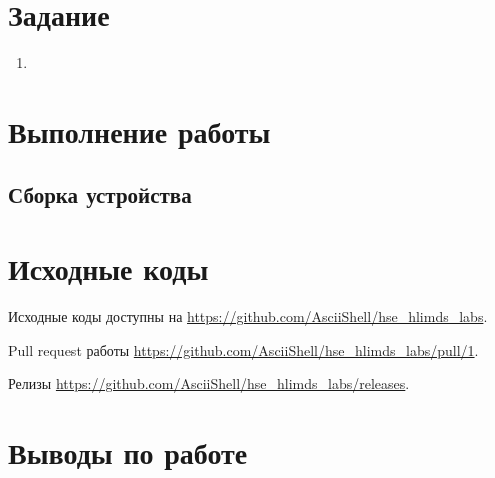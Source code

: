 \documentclass[a4paper,14pt]{article}
\begin{document}
    
    \tableofcontents
    \pagebreak


    \section{Задание}

    \begin{enumerate}
        \item
    \end{enumerate}


    \section{Выполнение работы}

    \subsection{Сборка устройства}


    \section{Исходные коды}

    Исходные коды доступны на \href{https://github.com/AsciiShell/hse_hlimds_labs}
    {https://github.com/AsciiShell/hse\_hlimds\_labs}.

    Pull request работы \href{https://github.com/AsciiShell/hse_hlimds_labs/pull/2}
    {https://github.com/AsciiShell/hse\_hlimds\_labs/pull/1}.

    Релизы \href{https://github.com/AsciiShell/hse_hlimds_labs/releases}
    {https://github.com/AsciiShell/hse\_hlimds\_labs/releases}.


    \section{Выводы по работе}
\end{document}

